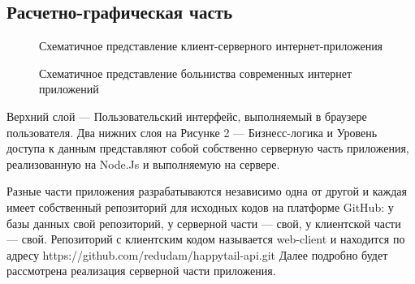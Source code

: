 \documentclass[12pt]{article}
\begin{document}
\subsection*{Расчетно-графическая часть }
\begin{figure}[h]
	\caption{Схематичное представление клиент-серверного интернет-приложения}
\end{figure}
\begin{figure}[h]
	\caption{Схематичное представление больниства современных интернет приложений}
\end{figure}
\newpage
Верхний слой --- Пользовательский интерфейс, выполняемый в браузере пользователя. Два нижних слоя на Рисунке 2 --- Бизнесс-логика и Уровень доступа к данным представляют собой собственно серверную часть приложения, реализованную на Node.Js и выполняемую на сервере.

Разные части приложения разрабатываются независимо одна от другой и каждая имеет собственный репозиторий для исходных кодов на платформе GitHub: у базы данных свой репозиторий, у серверной части --- свой, у клиентской части --- свой. Репозиторий с клиентским кодом называется web-client и находится по адресу https://github.com/redudam/happytail-api.git Далее подробно будет рассмотрена реализация серверной части приложения. 
\end{document}
